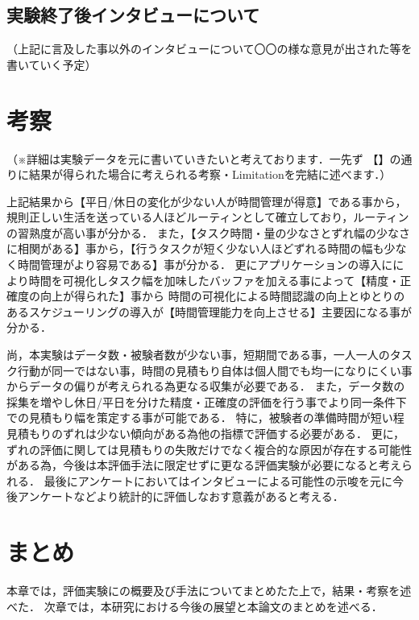 \subsection{実験終了後インタビューについて}
（上記に言及した事以外のインタビューについて〇〇の様な意見が出された等を書いていく予定）


\section{考察}
（※詳細は実験データを元に書いていきたいと考えております．一先ず
【】の通りに結果が得られた場合に考えられる考察・Limitationを完結に述べます．）

上記結果から【平日/休日の変化が少ない人が時間管理が得意】である事から，規則正しい生活を送っている人ほどルーティンとして確立しており，ルーティンの習熟度が高い事が分かる．
また，【タスク時間・量の少なさとずれ幅の少なさに相関がある】事から，【行うタスクが短く少ない人ほどずれる時間の幅も少なく時間管理がより容易である】事が分かる．
更にアプリケーションの導入ににより時間を可視化しタスク幅を加味したバッファを加える事によって【精度・正確度の向上が得られた】事から
時間の可視化による時間認識の向上とゆとりのあるスケジューリングの導入が【時間管理能力を向上させる】主要因になる事が分かる．

尚，本実験はデータ数・被験者数が少ない事，短期間である事，一人一人のタスク行動が同一ではない事，時間の見積もり自体は個人間でも均一になりにくい事からデータの偏りが考えられる為更なる収集が必要である．
また，データ数の採集を増やし休日/平日を分けた精度・正確度の評価を行う事でより同一条件下での見積もり幅を策定する事が可能である．
特に，被験者の準備時間が短い程見積もりのずれは少ない傾向がある為他の指標で評価する必要がある．
更に，ずれの評価に関しては見積もりの失敗だけでなく複合的な原因が存在する可能性がある為，今後は本評価手法に限定せずに更なる評価実験が必要になると考えられる．
最後にアンケートにおいてはインタビューによる可能性の示唆を元に今後アンケートなどより統計的に評価しなおす意義があると考える．

\section{まとめ}
本章では，評価実験にの概要及び手法についてまとめたた上で，結果・考察を述べた．
次章では，本研究における今後の展望と本論文のまとめを述べる．
